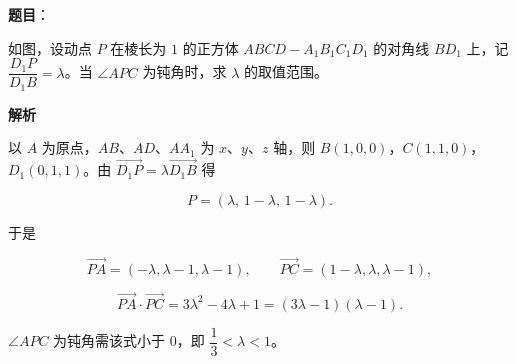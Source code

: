 \begin{answer}

\textbf{题目}：

如图，设动点 $P$ 在棱长为 $1$ 的正方体 $ABCD-A_1B_1C_1D_1$ 的对角线 $BD_1$ 上，记 $\dfrac{D_1P}{D_1B}=\lambda$。当 $\angle APC$ 为钝角时，求 $\lambda$ 的取值范围。
\nopagebreak[4]
\begin{center}\end{center}
\nopagebreak[4]
\textbf{解析}

以 $A$ 为原点，$AB$、$AD$、$AA_1$ 为 $x$、$y$、$z$ 轴，则 $B(1,0,0)$，$C(1,1,0)$，$D_1(0,1,1)$。由 $\overrightarrow{D_1P}=\lambda\overrightarrow{D_1B}$ 得

\nopagebreak[4]
\[P=(\lambda,\,1-\lambda,\,1-\lambda).\]

于是

\nopagebreak[4]
\[\overrightarrow{PA}=(-\lambda,\lambda-1,\lambda-1),\qquad \overrightarrow{PC}=(1-\lambda,\lambda,\lambda-1),\]

\nopagebreak[4]
\[\overrightarrow{PA}\cdot\overrightarrow{PC}=3\lambda^2-4\lambda+1=(3\lambda-1)(\lambda-1).\]

$\angle APC$ 为钝角需该式小于 $0$，即 $\dfrac13<\lambda<1$。


\end{answer}
